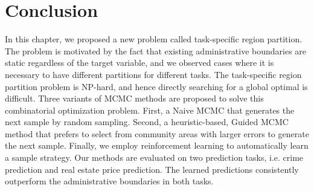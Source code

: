 \section{Conclusion}
\label{sec:conclusion}


In this chapter, we proposed a new problem called task-specific region partition. The problem is motivated by the fact that existing administrative boundaries are static regardless of the target variable, and we observed cases where it is necessary to have different partitions for different tasks. The task-specific region partition problem is NP-hard, and hence directly searching for a global optimal is difficult. Three variants of MCMC methods are proposed to solve this combinatorial optimization problem. First, a Naive MCMC that generates the next sample by random sampling. Second, a heuristic-based, Guided MCMC method that prefers to select from community areas with larger errors to generate the next sample. Finally, we employ reinforcement learning to automatically learn a sample strategy. Our methods are evaluated on two prediction tasks, i.e. crime prediction and real estate price prediction. The learned predictions consistently outperform the administrative boundaries in both tasks.